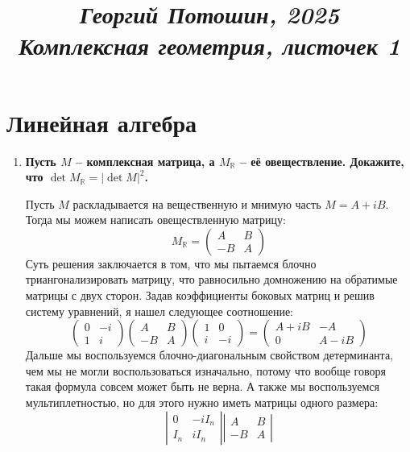 \documentclass{article}
\title{
\textit{\small{Георгий Потошин, 2025}}\\
\vspace{0.3ex}
\textit{\huge{Комплексная геометрия, листочек 1}}\vspace{1ex}
}
\date{\vspace{-10ex}}
\begin{document}
\maketitle

\section{Линейная алгебра}
\begin{enumerate}
\item \textbf{Пусть $M$ – комплексная матрица, а $M_{\mathbb R}$ – её
    овеществление. Докажите, что $\det M_{\mathbb R}=|\det M|^2$.}

    Пусть $M$ раскладывается на вещественную и мнимую часть $M=A+iB$. Тогда
    мы можем написать овеществленную матрицу:
    \[
        M_{\mathbb R} = \left(\begin{array}{cc}A&B\\-B&A\end{array}\right)
    \]
    Суть решения заключается в том, что мы пытаемся блочно триангонализировать
    матрицу, что равносильно домножению на обратимые матрицы с двух сторон.
    Задав коэффициенты боковых матриц и решив систему уравнений, я нашел
    следующее соотношение:
    \[
        \left(\begin{array}{cc}0&-i\\1&i\end{array}\right)
        \left(\begin{array}{cc}A&B\\-B&A\end{array}\right)
        \left(\begin{array}{cc}1&0\\i&-i\end{array}\right)
        =
        \left(\begin{array}{cc}A+iB&-A\\0&A-iB\end{array}\right)
    \]
    Дальше мы воспользуемся блочно-диагональным свойством детерминанта, чем мы
    не могли воспользоваться изначально, потому что вообще говоря такая формула
    совсем может быть не верна. А также мы воспользуемся мультиплетностью, но
    для этого нужно иметь матрицы одного размера:
    \[
        \left|\begin{array}{cc}0&-iI_n\\I_n&iI_n\end{array}\right|
        \left|\begin{array}{cc}A&B\\-B&A\end{array}\right|
\]
\end{enumerate}
\end{document}
